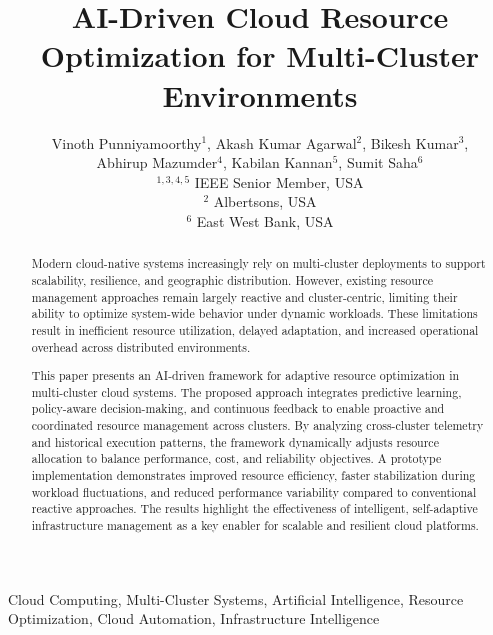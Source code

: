 \documentclass[conference]{IEEEtran}
\begin{document}
\title{AI-Driven Cloud Resource Optimization for Multi-Cluster Environments}

\author{
Vinoth Punniyamoorthy$^{1}$,
Akash Kumar Agarwal$^{2}$,
Bikesh Kumar$^{3}$,\\
Abhirup Mazumder$^{4}$,
Kabilan Kannan$^{5}$,
Sumit Saha$^{6}$
\\[1ex]

\small $^{1,3,4,5}$ IEEE Senior Member, USA\\
\small $^{2}$ Albertsons, USA\\
\small $^{6}$ East West Bank, USA\\

}

\maketitle

\begin{abstract}
Modern cloud-native systems increasingly rely on multi-cluster deployments to support scalability, resilience, and geographic distribution. However, existing resource management approaches remain largely reactive and cluster-centric, limiting their ability to optimize system-wide behavior under dynamic workloads. These limitations result in inefficient resource utilization, delayed adaptation, and increased operational overhead across distributed environments.

This paper presents an AI-driven framework for adaptive resource optimization in multi-cluster cloud systems. The proposed approach integrates predictive learning, policy-aware decision-making, and continuous feedback to enable proactive and coordinated resource management across clusters. By analyzing cross-cluster telemetry and historical execution patterns, the framework dynamically adjusts resource allocation to balance performance, cost, and reliability objectives. A prototype implementation demonstrates improved resource efficiency, faster stabilization during workload fluctuations, and reduced performance variability compared to conventional reactive approaches. The results highlight the effectiveness of intelligent, self-adaptive infrastructure management as a key enabler for scalable and resilient cloud platforms.
\end{abstract}


\begin{IEEEkeywords}
Cloud Computing, Multi-Cluster Systems, Artificial Intelligence, Resource Optimization, Cloud Automation, Infrastructure Intelligence
\end{IEEEkeywords}
\end{document}
